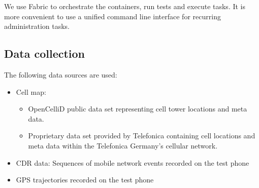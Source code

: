 We use Fabric to orchestrate the containers, run tests and execute tasks. It is more convenient to use a unified command line interface for recurring administration tasks. \cite{fabric}

\subsection{Data collection}
The following data sources are used:
\begin{itemize}
\item Cell map:
\begin{itemize}
    \item OpenCelliD public data set representing cell tower locations and meta data.
    \item Proprietary data set provided by Telefonica containing cell locations and meta data within the Telefonica Germany's cellular network.
\end{itemize}
\item CDR data: Sequences of mobile network events recorded on the test phone
\item GPS trajectories recorded on the test phone
\end{itemize}

